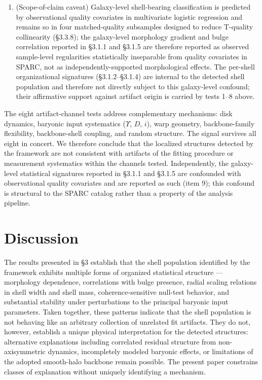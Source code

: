\documentclass[linenumbers,trackchanges]{aastex701}
\begin{document}
\begin{enumerate}
  \item (Scope-of-claim caveat) Galaxy-level shell-bearing classification is predicted by observational quality covariates in multivariate logistic regression and remains so in four matched-quality subsamples designed to reduce T-quality collinearity (\S3.3.8); the galaxy-level morphology gradient and bulge correlation reported in \S3.1.1 and \S3.1.5 are therefore reported as observed sample-level regularities statistically inseparable from quality covariates in SPARC, not as independently-supported morphological effects. The per-shell organizational signatures (\S3.1.2--\S3.1.4) are internal to the detected shell population and therefore not directly subject to this galaxy-level confound; their affirmative support against artifact origin is carried by tests 1--8 above.
\end{enumerate}

The eight artifact-channel tests address complementary mechanisms: disk dynamics, baryonic input systematics ($\Upsilon$, $D$, $i$), warp geometry, backbone-family flexibility, backbone-shell coupling, and random structure. The signal survives all eight in concert. We therefore conclude that the localized structures detected by the framework are not consistent with artifacts of the fitting procedure or measurement systematics within the channels tested. Independently, the galaxy-level statistical signatures reported in \S3.1.1 and \S3.1.5 are confounded with observational quality covariates and are reported as such (item 9); this confound is structural to the SPARC catalog rather than a property of the analysis pipeline.

\section{Discussion}

The results presented in \S3 establish that the shell population identified by the framework exhibits multiple forms of organized statistical structure --- morphology dependence, correlations with bulge presence, radial scaling relations in shell width and shell mass, coherence-sensitive null-test behavior, and substantial stability under perturbations to the principal baryonic input parameters. Taken together, these patterns indicate that the shell population is not behaving like an arbitrary collection of unrelated fit artifacts. They do not, however, establish a unique physical interpretation for the detected structures: alternative explanations including correlated residual structure from non-axisymmetric dynamics, incompletely modeled baryonic effects, or limitations of the adopted smooth-halo backbone remain possible. The present paper constrains classes of explanation without uniquely identifying a mechanism.
\end{document}
